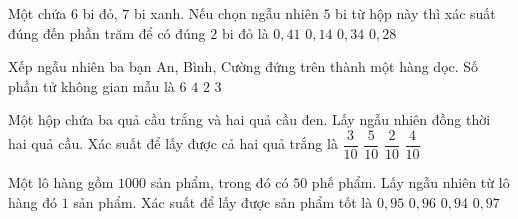 \begin{ex}%
	Một chứa $6$ bi đỏ, $7$ bi xanh. Nếu chọn ngẫu nhiên $5$ bi từ hộp này thì xác suất đúng đến phần trăm để có đúng $2$ bi đỏ là
	\choice
	{\True $0{,}41$}
	{$0{,}14$}
	{$0{,}34$}
	{$0{,}28$}
\end{ex}


\begin{ex}%
	Xếp ngẫu nhiên ba bạn An, Bình, Cường đứng trên thành một hàng dọc. Số phần tử không gian mẫu là
	\choice
	{\True $6$}
	{$4$}
	{$2$}
	{$3$}	
\end{ex}


\begin{ex}%
	Một hộp chứa ba quả cầu trắng và hai quả cầu đen. Lấy ngẫu nhiên đồng thời hai quả cầu. Xác suất để lấy được cả hai quả trắng là
	\choice
	{\True $\dfrac{3}{10}$}
	{$\dfrac{5}{10}$}
	{$\dfrac{2}{10}$}
	{$\dfrac{4}{10}$}
\end{ex}


\begin{ex}%
	Một lô hàng gồm $1000$ sản phẩm, trong đó có $50$ phế phẩm. Lấy ngẫu nhiên từ lô hàng đó $1$ sản phẩm. Xác suất để lấy được sản phẩm tốt là
	\choice
	{\True $0{,}95$}
	{$0{,}96$}
	{$0{,}94$}
	{$0{,}97$}
\end{ex}


